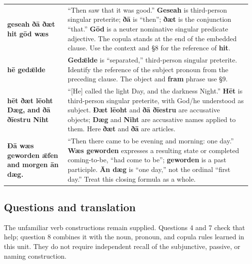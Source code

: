 \begin{longtable}{@{}>{\raggedright\arraybackslash}p{32.28mm}>{\raggedright\arraybackslash}p{88.908mm}@{}}
\textbf{geseah ðā ðæt hit gōd wæs} & “Then saw that it was good.” \textbf{Geseah} is third-person singular preterite; \textbf{ðā} is “then”; \textbf{ðæt} is the conjunction “that.” \textbf{Gōd} is a neuter nominative singular predicate adjective. The copula stands at the end of the embedded clause. Use the context and §8 for the reference of \textbf{hit}. \\
\textbf{hē gedǣlde} & \textbf{Gedǣlde} is “separated,” third-person singular preterite. Identify the reference of the subject pronoun from the preceding clause. The object and \textbf{fram} phrase use §9. \\
\textbf{hēt ðæt lēoht Dæg, and ðā ðīestru Niht} & “[He] called the light Day, and the darkness Night.” \textbf{Hēt} is third-person singular preterite, with God/\allowbreak{}he understood as subject. \textbf{Ðæt lēoht} and \textbf{ðā ðīestru} are accusative objects; \textbf{Dæg} and \textbf{Niht} are accusative names applied to them. Here \textbf{ðæt} and \textbf{ðā} are articles. \\
\textbf{Ðā wæs geworden ǣfen and morgen ān dæg.} & “Then there came to be evening and morning: one day.” \textbf{Wæs geworden} expresses a resulting state or completed coming-to-be, “had come to be”; \textbf{geworden} is a past participle. \textbf{Ān dæg} is “one day,” not the ordinal “first day.” Treat this closing formula as a whole. \\
\end{longtable}
\par\endgroup

\subsection*{Questions and translation}

The unfamiliar verb constructions remain supplied. Questions 4 and 7 check that help; question 8 combines it with the noun, pronoun, and copula rules learned in this unit. They do not require independent recall of the subjunctive, passive, or naming construction.



